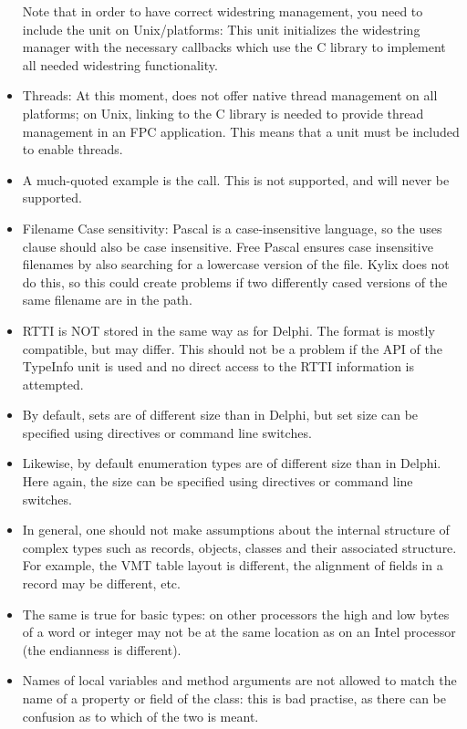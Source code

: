 \begin{itemize}
Note that in order to have correct widestring management, you need to
include the  unit on Unix/\linux platforms: This unit
initializes the widestring manager with the necessary callbacks which
use the C library to implement all needed widestring functionality.
\item Threads: At this moment, \fpc does not offer native thread 
management on all platforms; on Unix, linking to the C library is 
needed to provide thread management in an FPC application. 
This means that a  unit must be included to enable 
threads.
\item A much-quoted example is the  call. 
This is not supported, and will never be supported.
\item Filename Case sensitivity: Pascal is a case-insensitive language,
so the uses clause should also be case insensitive. Free Pascal ensures
case insensitive filenames by also searching for a lowercase version 
of the file. Kylix does not do this, so this could create problems
if two differently cased versions of the same filename are in the path.
\item RTTI is NOT stored in the same way as for Delphi. The format is mostly compatible, but may differ. This should not be a problem if the API of the TypeInfo unit 
is used and no direct access to the RTTI information is attempted.
\item By default, sets are of different size than in Delphi, but set size
can be specified using directives or command line switches.
\item Likewise, by default enumeration types are of different size than in
Delphi. Here again, the size can be specified using directives or command
line switches.
\item In general, one should not make assumptions about the internal
structure of complex types such as records, objects, classes and their
associated structure. For example, the VMT table layout is different, the
alignment of fields in a record may be different, etc. 
\item The same is true for basic types: on other processors the high and low
bytes of a word or integer may not be at the same location as on an Intel
processor (the endianness is different).
\item Names of local variables and method arguments are not allowed to 
match the name of a property or field of the class: this is bad practise,
as there can be confusion as to which of the two is meant.
\end{itemize}


